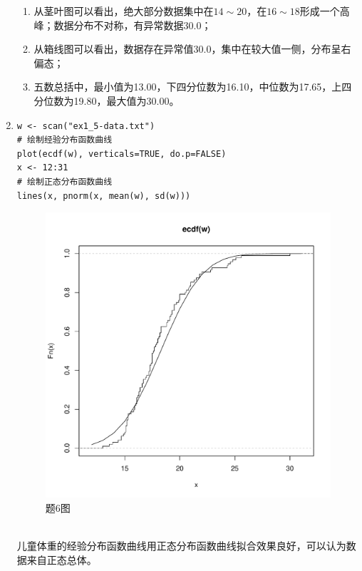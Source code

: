 \begin{enumerate}
\begin{lstlisting}
\end{lstlisting}
        \summary
        \begin{enumerate}[label=(\arabic*)]
            \item 从茎叶图可以看出，绝大部分数据集中在$14 \sim 20$，在$16 \sim 18$形成一个高峰；数据分布不对称，有异常数据30.0；
            \item 从箱线图可以看出，数据存在异常值30.0，集中在较大值一侧，分布呈右偏态；
            \item 五数总括中，最小值为13.00，下四分位数为16.10，中位数为17.65，上四分位数为19.80，最大值为30.00。
        \end{enumerate}
        \item
        \code
\begin{lstlisting}
w <- scan("ex1_5-data.txt")
# 绘制经验分布函数曲线
plot(ecdf(w), verticals=TRUE, do.p=FALSE)
x <- 12:31
# 绘制正态分布函数曲线
lines(x, pnorm(x, mean(w), sd(w)))
\end{lstlisting}
        \out
        \begin{figure}[H]
            \centering
            \includegraphics[scale=0.5]{1-6.pdf}
            \caption{题6图}
        \end{figure}
        \summary\\
        儿童体重的经验分布函数曲线用正态分布函数曲线拟合效果良好，可以认为数据来自正态总体。

\end{enumerate}

